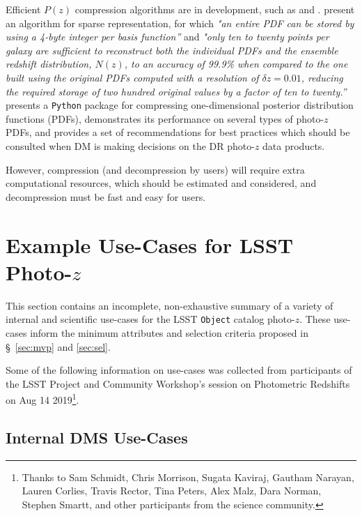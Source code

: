 \documentclass[DM,lsstdraft,toc]{lsstdoc}
\begin{document}
Efficient $P(z)$ compression algorithms are in development, such as \citet{2014MNRAS.441.3550C} and \citet{2018AJ....156...35M}.
\citet{2014MNRAS.441.3550C} present an algorithm for sparse representation, for which {\it "an entire PDF can be stored by using a 4-byte integer per basis function''} and {\it "only ten to twenty points per galaxy are sufficient to reconstruct both the individual PDFs and the ensemble redshift distribution, $N(z)$, to an accuracy of 99.9\% when compared to the one built using the original PDFs computed with a resolution of $\delta z = 0.01$, reducing the required storage of two hundred original values by a factor of ten to twenty.''} 
\citet{2018AJ....156...35M} presents a {\tt Python} package for compressing one-dimensional posterior distribution functions (PDFs), demonstrates its performance on several types of photo-$z$ PDFs, and provides a set of recommendations for best practices which should be consulted when DM is making decisions on the DR photo-$z$ data products.

However, compression (and decompression by users) will require extra computational resources, which should be estimated and considered, and decompression must be fast and easy for users.


\clearpage
\section{Example Use-Cases for LSST Photo-$z$} \label{sec:use}

This section contains an incomplete, non-exhaustive summary of a variety of internal and scientific use-cases for the LSST {\tt Object} catalog photo-$z$.
These use-cases inform the minimum attributes and selection criteria proposed in \S~\ref{sec:mvp} and \ref{sec:sel}. 

Some of the following information on use-cases was collected from participants of the LSST Project and Community Workshop's session on Photometric Redshifts on Aug 14 2019\footnote{Thanks to Sam Schmidt, Chris Morrison, Sugata Kaviraj, Gautham Narayan, Lauren Corlies, Travis Rector, Tina Peters, Alex Malz, Dara Norman, Stephen Smartt, and other participants from the science community.}.

\subsection{Internal DMS Use-Cases}\label{ssec:use_dm}
\end{document}
